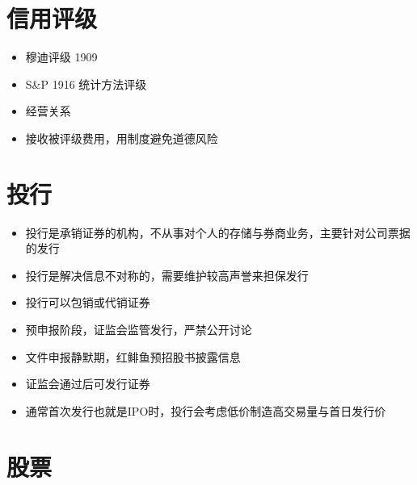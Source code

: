 \documentclass[
]{book}
\providecommand{\tightlist}{%
  \setlength{\itemsep}{0pt}\setlength{\parskip}{0pt}}
\begin{document}
\hypertarget{ux4fe1ux7528ux8bc4ux7ea7}{%
\section{信用评级}\label{ux4fe1ux7528ux8bc4ux7ea7}}

\begin{itemize}
\tightlist
\item
  穆迪评级 1909
\item
  S\&P 1916 统计方法评级
\item
  经营关系
\item
  接收被评级费用，用制度避免道德风险
\end{itemize}

\hypertarget{ux6295ux884c}{%
\section{投行}\label{ux6295ux884c}}

\begin{itemize}
\tightlist
\item
  投行是承销证券的机构，不从事对个人的存储与券商业务，主要针对公司票据的发行
\item
  投行是解决信息不对称的，需要维护较高声誉来担保发行
\item
  投行可以包销或代销证券
\item
  预申报阶段，证监会监管发行，严禁公开讨论
\item
  文件申报静默期，红鲱鱼预招股书披露信息
\item
  证监会通过后可发行证券
\item
  通常首次发行也就是IPO时，投行会考虑低价制造高交易量与首日发行价
\end{itemize}

\hypertarget{ux80a1ux7968}{%
\section{股票}\label{ux80a1ux7968}}
\end{document}
